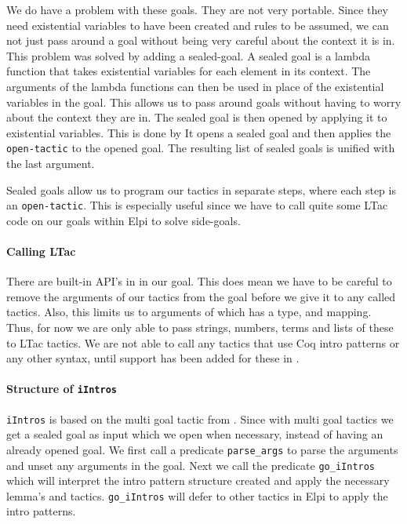\documentclass[thesis.tex]{subfiles}
\begin{document}
We do have a problem with these goals. They are not very portable. Since they need existential variables to have been created and rules to be assumed, we can not just pass around a goal without being very careful about the context it is in. This problem was solved by adding a sealed-goal. A sealed goal is a lambda function that takes existential variables for each element in its context. The arguments of the lambda functions can then be used in place of the existential variables in the goal. This allows us to pass around goals without having to worry about the context they are in. The sealed goal is then opened by applying it to existential variables. This is done by  It opens a sealed goal and then applies the \texttt{open-tactic} to the opened goal. The resulting list of sealed goals is unified with the last argument.

Sealed goals allow us to program our tactics in separate steps, where each step is an \texttt{open-tactic}. This is especially useful since we have to call quite some LTac code on our goals within Elpi to solve side-goals.

\paragraph*{Calling LTac}
There are built-in API's in \ce in our goal. This does mean we have to be careful to remove the arguments of our tactics from the goal before we give it to any called tactics. Also, this limits us to arguments of which \ce has a type, and mapping. Thus, for now we are only able to pass strings, numbers, terms and lists of these to LTac tactics. We are not able to call any tactics that use Coq intro patterns or any other syntax, until support has been added for these in \ce.

\paragraph*[Structure of iIntros]{Structure of \texttt{iIntros}}
\texttt{iIntros} is based on the multi goal tactic from \ce. Since with multi goal tactics we get a sealed goal as input which we open when necessary, instead of having an already opened goal. We first call a predicate \texttt{parse_args} to parse the arguments and unset any arguments in the goal. Next we call the predicate \texttt{go_iIntros} which will interpret the intro pattern structure created and apply the necessary lemma's and tactics. \texttt{go_iIntros} will defer to other tactics in Elpi to apply the intro patterns.
\end{document}
